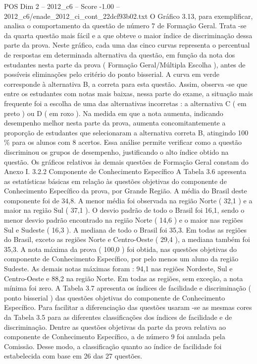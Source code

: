 \begin{textsample}{POS Dim 2 – 2012\_c6 – Score -1.00 – 2012\_c6/enade\_2012\_ci\_cont\_22dcf93b02.txt}
O Gráfico 3.13, para exemplificar, analisa o comportamento da questão de número 7 de Formação Geral.
Trata -se da quarta questão mais fácil e a que obteve o maior índice de discriminação dessa parte da prova.
Neste gráfico, cada uma das cinco curvas representa o percentual de respostas em determinada alternativa da questão, em função da nota dos estudantes nesta parte da prova ( Formação Geral/Múltipla Escolha ), antes de possíveis eliminações pelo critério do ponto bisserial.
A curva em verde corresponde à alternativa B, a correta para esta questão.
Assim, observa -se que entre os estudantes com notas mais baixas, nessa parte do exame, a situação mais frequente foi a escolha de uma das alternativas incorretas : a alternativa C ( em preto ) ou D ( em roxo ).
Na medida em que a nota aumenta, indicando desempenho melhor nesta parte da prova, aumenta concomitantemente a proporção de estudantes que selecionaram a alternativa correta B, atingindo 100 \% para os alunos com 8 acertos.
Essa análise permite verificar como a questão discriminou os grupos de desempenho, justificando o alto índice obtido na questão.
Os gráficos relativos às demais questões de Formação Geral constam do Anexo I. 3.2.2 Componente de Conhecimento Específico A Tabela 3.6 apresenta as estatísticas básicas em relação às questões objetivas do componente de Conhecimento Específico da prova, por Grande Região.
A média do Brasil deste componente foi de 34,8.
A menor média foi observada na região Norte ( 32,1 ) e a maior na região Sul ( 37,1 ).
O desvio padrão de todo o Brasil foi 16,1, sendo o menor desvio padrão encontrado na região Norte ( 14,6 ) e o maior nas regiões Sul e Sudeste ( 16,3 ).
A mediana de todo o Brasil foi 35,3.
Em todas as regiões do Brasil, exceto as regiões Norte e Centro-Oeste ( 29,4 ), a mediana também foi 35,3.
A nota máxima da prova ( 100,0 ) foi obtida, nas questões objetivas do componente de Conhecimento Específico, por pelo menos um aluno da região Sudeste.
As demais notas máximas foram : 94,1 nas regiões Nordeste, Sul e Centro-Oeste e 88,2 na região Norte.
Em todas as regiões, sem exceção, a nota mínima foi zero.
A Tabela 3.7 apresenta os índices de facilidade e discriminação ( ponto bisserial ) das questões objetivas do componente de Conhecimento Específico.
Para facilitar a diferenciação das questões usaram -se as mesmas cores da Tabela 3.5 para as diferentes classificações dos índices de facilidade e de discriminação.
Dentre as questões objetivas da parte da prova relativa ao componente de Conhecimento Específico, a de número 9 foi anulada pela Comissão.
Desse modo, a classificação quanto ao índice de facilidade foi estabelecida com base em 26 das 27 questões.

\end{textsample}
